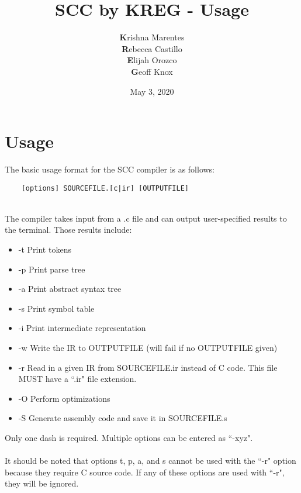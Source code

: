 \documentclass{article}
\title{SCC by KREG - Usage}
\author{\textbf{K}rishna Marentes\\\textbf{R}ebecca Castillo\\\textbf{E}lijah Orozco\\\textbf{G}eoff Knox}
\date{May 3, 2020}
\begin{document}
\maketitle

\section{Usage}
The basic usage format for the SCC compiler is as follows:
\begin{verbatim}
    [options] SOURCEFILE.[c|ir] [OUTPUTFILE]
\end{verbatim}
\\
The compiler takes input from a .c file and can output user-specified results to the terminal. Those results include:
\begin{itemize}
    \item -t Print tokens
    \item -p Print parse tree
    \item -a Print abstract syntax tree
    \item -s Print symbol table
    \item -i Print intermediate representation
    \item -w Write the IR to OUTPUTFILE (will fail if no OUTPUTFILE given)
    \item -r Read in a given IR from SOURCEFILE.ir instead of C
    code. This file MUST have a ``.ir" file extension.
    \item -O Perform optimizations
    \item -S Generate assembly code and save it in SOURCEFILE.s
\end{itemize}
Only one dash is required. Multiple options can be entered as ``-xyz".\\
\\
It should be noted that options t, p, a, and s cannot be used with the ``-r" option because they require C source code.
If any of these options are used with ``-r", they will be ignored.
\end{document}
